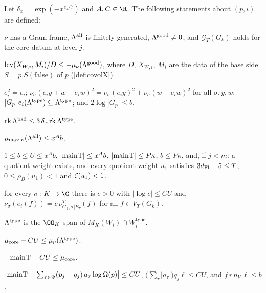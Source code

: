 \begin{definition}\label{pf:lift2:def:pred}
Let $\delta_x=\exp(-x^{e_z/7})$ and $A,C\in\R$. The following statements about $(p,i)$ are defined:
\begin{description}[style=unboxed,leftmargin=0pt]
\item[$\lifttwoP{GramAt}$] $\nu$ has a Gram frame, $\Lambda^{\mathrm{all}}$ is finitely generated,
$\Lambda^{\mathrm{good}}\ne0$, and $\mathcal G_T(G_k)$ holds for the core datum at level $j$.
\item[$\lifttwoP{RecAt}$] $\operatorname{lcv}(X_{W,i},M_i)/D\le-\mu_\nu(\Lambda^{\mathrm{good}})$, where $D$, $X_{W,i}$, $M_i$ are
the data of the base side $S=p.S(\mathrm{false})$ of $p$ (\cref{def:covolX}).
\item[$\lifttwoP{CutAt}$] $e_i^2=e_i$; $\nu_\sigma(e_iy+w-e_iw)^2=\nu_\sigma(e_iy)^2+\nu_\sigma(w-e_iw)^2$ for all
$\sigma,y,w$; $|G_p|\,e_i(\Lambda^{\mathrm{type}})\subseteq\Lambda^{\mathrm{type}}$; and $2\log|G_p|\le b$.
\item[$\lifttwoP{BadAt}$] $\operatorname{rk}\Lambda^{\mathrm{bad}}\le3\,\delta_x\operatorname{rk}\Lambda^{\mathrm{type}}$.
\item[$\lifttwoP{LamAt}(A)$] $\mu_{\max,\nu}(\Lambda^{\mathrm{all}})\le x^Ab$.
\item[$\lifttwoP{SizeAt}(P,A)$] $1\le b\le U\le x^Ab$, $|\mathrm{mainT}|\le x^Ab$, $|\mathrm{mainT}|\le P\kappa$,
$b\le P\kappa$, and, if $j<m$: a quotient weight exists, and every quotient weight $u_1$ satisfies
$3d_{\mathrm{Fl}}+5\le T$, $0\le\rho_B(u_1)<1$ and $\zeta(u_1)<1$.
\item[$\lifttwoP{MeasAt}(C)$] for every $\sigma\colon K\to\C$ there is $c>0$ with $|\log c|\le CU$ and
$\nu_\sigma(e_i(f))=c\,\nu^T_{G_k,\sigma|F_T}(f)$ for all $f\in V_T(G_k)$.
\item[$\lifttwoP{RatAt}$] $\Lambda^{\mathrm{type}}$ is the $\OO_K$-span of $M_K(W_i)\cap W_i^{\mathrm{type}}$.
\item[$\lifttwoP{CoreAt}(C)$] $\mu_{\mathrm{core}}-CU\le\mu_\nu(\Lambda^{\mathrm{type}})$.
\item[$\lifttwoP{LowAt}(C)$] $-\mathrm{mainT}-CU\le\mu_{\mathrm{core}}$.
\item[$\lifttwoP{AnchorAt}(C)$] $\bigl|\mathrm{mainT}-\sum_{\tau\in\Psi}(p_j-q_j)\,a_\tau\log\Omega(p)\bigr|\le CU$,
$\bigl(\sum_\tau|a_\tau|\bigr)q_j\ell\le CU$, and $f\,r\,n_V\,\ell\le b$.
\end{description}
\end{definition}

